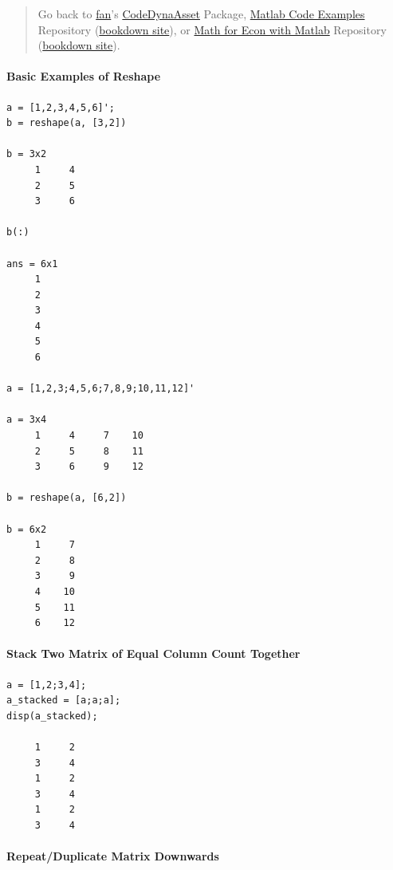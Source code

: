 \documentclass[
]{book}
\begin{document}
\begin{quote}
Go back to \href{http://fanwangecon.github.io/}{fan}'s \href{https://fanwangecon.github.io/CodeDynaAsset/}{CodeDynaAsset} Package, \href{https://fanwangecon.github.io/M4Econ/}{Matlab Code Examples} Repository (\href{https://fanwangecon.github.io/M4Econ/bookdown}{bookdown site}), or \href{https://fanwangecon.github.io/Math4Econ/}{Math for Econ with Matlab} Repository (\href{https://fanwangecon.github.io/Math4Econ/bookdown}{bookdown site}).
\end{quote}

\hypertarget{basic-examples-of-reshape}{%
\paragraph{Basic Examples of Reshape}\label{basic-examples-of-reshape}}

\begin{verbatim}
a = [1,2,3,4,5,6]';
b = reshape(a, [3,2])

b = 3x2    
     1     4
     2     5
     3     6

b(:)

ans = 6x1    
     1
     2
     3
     4
     5
     6

a = [1,2,3;4,5,6;7,8,9;10,11,12]'

a = 3x4    
     1     4     7    10
     2     5     8    11
     3     6     9    12

b = reshape(a, [6,2])

b = 6x2    
     1     7
     2     8
     3     9
     4    10
     5    11
     6    12
\end{verbatim}

\hypertarget{stack-two-matrix-of-equal-column-count-together}{%
\paragraph{\texorpdfstring{\textbf{Stack Two Matrix of Equal Column Count Together}}{Stack Two Matrix of Equal Column Count Together}}\label{stack-two-matrix-of-equal-column-count-together}}

\begin{verbatim}
a = [1,2;3,4];
a_stacked = [a;a;a];
disp(a_stacked);

     1     2
     3     4
     1     2
     3     4
     1     2
     3     4
\end{verbatim}

\hypertarget{repeatduplicate-matrix-downwards}{%
\paragraph{\texorpdfstring{\textbf{Repeat/Duplicate Matrix Downwards}}{Repeat/Duplicate Matrix Downwards}}\label{repeatduplicate-matrix-downwards}}
\end{document}
